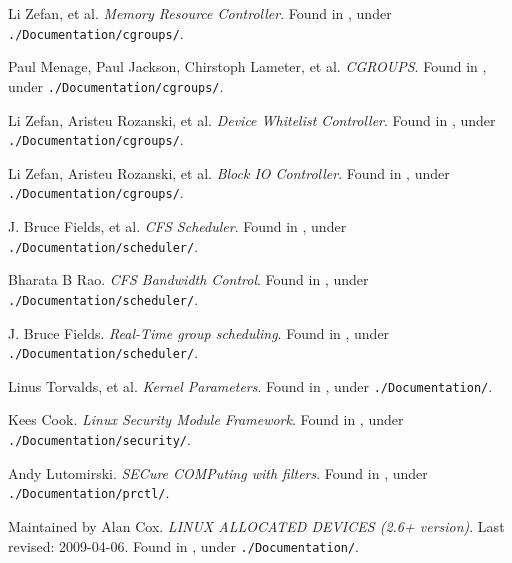 \begin{thebibliography}{9}

Li Zefan, et al.  \emph{Memory Resource Controller}. Found in
\cite{linux-kernel-v3.14.2}, under \texttt{./Documentation/cgroups/}.


Paul Menage, Paul Jackson, Chirstoph Lameter, et al. \emph{CGROUPS}.  Found in
\cite{linux-kernel-v3.14.2}, under \texttt{./Documentation/cgroups/}.


Li Zefan, Aristeu Rozanski, et al. \emph{Device Whitelist Controller}.  Found
in \cite{linux-kernel-v3.14.2}, under \texttt{./Documentation/cgroups/}.


Li Zefan, Aristeu Rozanski, et al. \emph{Block IO Controller}.  Found
in \cite{linux-kernel-v3.14.2}, under \texttt{./Documentation/cgroups/}.


J. Bruce Fields, et al. \emph{CFS Scheduler}.  Found in
\cite{linux-kernel-v3.14.2}, under \texttt{./Documentation/scheduler/}.


Bharata B Rao. \emph{CFS Bandwidth Control}.  Found in
\cite{linux-kernel-v3.14.2}, under \texttt{./Documentation/scheduler/}.


J. Bruce Fields. \emph{Real-Time group scheduling}.  Found in
\cite{linux-kernel-v3.14.2}, under \texttt{./Documentation/scheduler/}.


Linus Torvalds, et al. \emph{Kernel Parameters}. Found in
\cite{linux-kernel-v3.14.2}, under \texttt{./Documentation/}.


Kees Cook. \emph{Linux Security Module Framework}. Found in
\cite{linux-kernel-v3.14.2}, under \texttt{./Documentation/security/}.


Andy Lutomirski. \emph{SECure COMPuting with filters}. Found in
\cite{linux-kernel-v3.14.2}, under \texttt{./Documentation/prctl/}.


Maintained by Alan Cox. \emph{LINUX ALLOCATED DEVICES (2.6+ version)}. Last
revised: 2009-04-06. Found in \cite{linux-kernel-v3.14.2}, under
\texttt{./Documentation/}.

\end{thebibliography}
